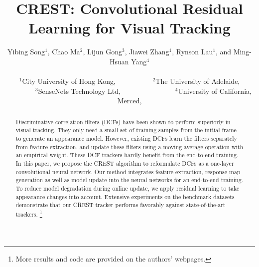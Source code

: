 \documentclass[10pt,twocolumn,letterpaper]{article}
\newcommand{\ryn}[1]{{\color{black}{#1}}}
\begin{document}
\title{CREST: Convolutional Residual Learning for Visual Tracking}

\author{Yibing Song$^1$, Chao Ma$^2$, Lijun Gong$^3$, Jiawei Zhang$^1$, Rynson \ryn{W.H.} Lau$^1$, and Ming-Hsuan Yang$^4$\\\\
$^1$City University of Hong Kong, \ryn{Hong Kong}~~~~~~~~~~$^2$The University of Adelaide, \ryn{Australia}\\
~~~~~~~~$^3$SenseNets Technology Ltd, \ryn{China}~~~~~~~~~~~~~~~$^4$University of California, Merced, \ryn{U.S.A.}\\
}

\maketitle


\begin{abstract}
Discriminative correlation filters (DCFs) have been shown to perform superiorly in visual tracking. They only need a small set of training samples from the initial frame to generate an appearance model. However, existing DCFs learn the filters separately from feature extraction, and update these filters using a moving average operation with an empirical weight. These DCF trackers hardly benefit from the end-to-end training. In this paper, we propose the CREST algorithm to reformulate DCFs as a one-layer convolutional neural network. Our method integrates feature extraction, response map generation as well as model update into the neural networks for an end-to-end training. To reduce model degradation during online update, we apply residual learning to take appearance changes into account. Extensive experiments on the benchmark datasets demonstrate that our CREST tracker performs favorably against state-of-the-art trackers. \footnote{More results and code are provided on the authors' webpages.}
\end{abstract}



\end{document}

